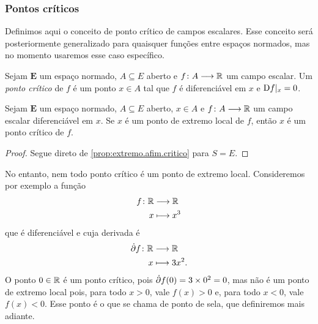 \subsubsection{Pontos críticos}

Definimos aqui o conceito de ponto crítico de campos escalares. Esse conceito será posteriormente generalizado para quaisquer funções entre espaços normados, mas no momento usaremos esse caso específico.

\begin{definition}
Sejam $\bm E$ um espaço normado, $A \subseteq E$ aberto e $f\colon \allowbreak A \longrightarrow \mathbb{R}$ um campo escalar. Um \emph{ponto crítico} de $f$ é um ponto $x \in A$ tal que $f$ é diferenciável em $x$ e $\mathrm{D} f|_x = 0$.
\end{definition}

\begin{proposition}
\label{prop:extremo.critico}
Sejam $\bm E$ um espaço normado, $A \subseteq E$ aberto, $x \in A$ e $f\colon \allowbreak A \longrightarrow \mathbb{R}$ um campo escalar diferenciável em $x$. Se $x$ é um ponto de extremo local de $f$, então $x$ é um ponto crítico de $f$.
\end{proposition}
\begin{proof}
Segue direto de \ref{prop:extremo.afim.critico} para $S = E$.
\end{proof}

No entanto, nem todo ponto crítico é um ponto de extremo local. Consideremos por exemplo a função
	\begin{align*}
	{f}\colon {\mathbb{R}} &\longrightarrow {\mathbb{R}} \\{x} &\longmapsto x^3
	\end{align*}
que é diferenciável e cuja derivada é
	\begin{align*}
	{\dot{\partial}f}\colon {\mathbb{R}} &\longrightarrow {\mathbb{R}} \\{x} &\longmapsto 3x^2.
	\end{align*}
O ponto $0 \in \mathbb{R}$ é um ponto crítico, pois $\dot{\partial} f(0) = 3 \times 0^2 = 0$, mas não é um ponto de extremo local pois, para todo $x>0$, vale $f(x)>0$ e, para todo $x<0$, vale $f(x)<0$. Esse ponto é o que se chama de ponto de sela, que definiremos mais adiante.

